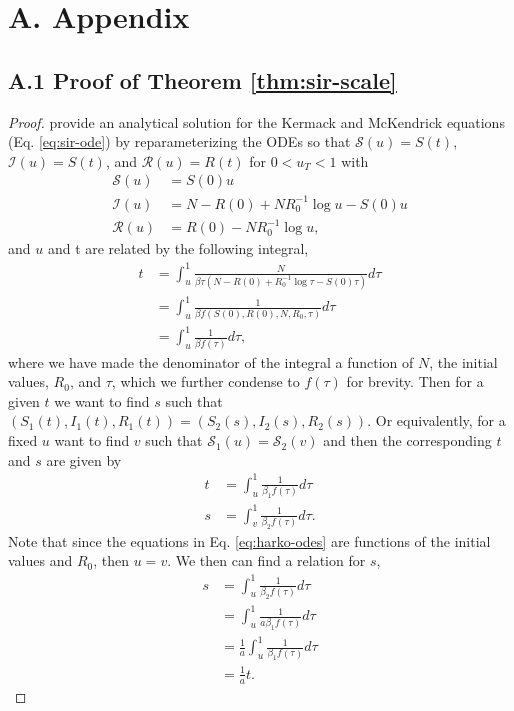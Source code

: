 \documentclass[
  shortnames]{jss}
\begin{document}
\hypertarget{a.-appendix}{%
\section*{A. Appendix}\label{a.-appendix}}

\hypertarget{a.1-proof-of-theorem}{%
\subsection*{\texorpdfstring{A.1 Proof of Theorem
\ref{thm:sir-scale}}{A.1 Proof of Theorem }}\label{a.1-proof-of-theorem}}

\begin{proof}\label{proof:thm}
\cite{Harko2014} provide an analytical solution for the Kermack and McKendrick equations (Eq. \eqref{eq:sir-ode}) by reparameterizing the ODEs so that $\mathcal{S}(u) = S(t)$, $\mathcal{I}(u) = S(t)$, and $\mathcal{R}(u) = R(t)$ for $0< u_T < 1$ with
\begin{align}\label{eq:harko-odes}
\mathcal{S}(u) &= S(0)u\\
\mathcal{I}(u) &= N - R(0) + NR_0^{-1}\log u - S(0)u \nonumber\\
\mathcal{R}(u) &= R(0) - NR_0^{-1} \log u, \nonumber
\end{align}
and $u$ and t are related by the following integral,
\begin{align*}
    t &= \int_{u}^1 \frac{N}{\beta \tau (N - R(0) + R_{0}^{-1} \log \tau - S(0)\tau)}d\tau \\
    &= \int_{u}^1 \frac{1}{\beta f(S(0), R(0), N, R_0, \tau)} d \tau\\
    &= \int_{u}^1 \frac{1}{\beta f(\tau)} d\tau,
\end{align*}
where we have made the denominator of the integral a function of $N$, the initial values, $R_0$, and $\tau$, which we further condense to $f(\tau)$ for brevity.
Then for a given $t$ we want to find $s$ such that $(S_1(t), I_1(t), R_1(t)) = (S_2(s), I_2(s), R_2(s))$.  Or equivalently, for a fixed $u$ want to find $v$ such that  $\mathcal{S}_1(u) = \mathcal{S}_2(v)$ and then the corresponding $t$ and $s$ are given by
\begin{align*}
    t & = \int_{u}^1 \frac{1}{\beta_1 f(\tau)} d\tau \\
    s & = \int_{v}^1 \frac{1}{\beta_2 f(\tau)} d\tau.
\end{align*}
Note that since the equations in Eq. \eqref{eq:harko-odes} are functions of the initial values and $R_0$, then $u = v$. We then can find a relation for $s$,
    \begin{align*}
    s & = \int_{u}^1 \frac{1}{\beta_2 f(\tau)} d\tau  \\
    & = \int_{u}^1 \frac{1}{a\beta_1 f(\tau)} d\tau \\ 
    &= \frac{1}{a}\int_{u}^1 \frac{1}{\beta_1 f(\tau)} d\tau \\
    &= \frac{1}{a}t.
\end{align*}
\end{proof}


\end{document}
